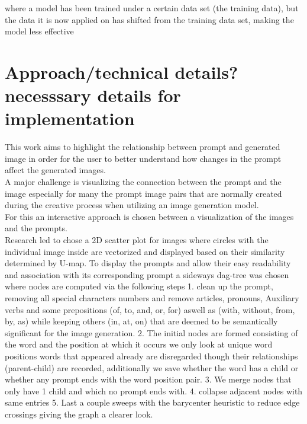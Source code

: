 \documentclass[
  a4paper,  %
  twoside,  %
  bibliography=totoc,
  headsepline,
  cleardoublepage=empty,
  parskip=half,
  draft=false
]{scrbook}
\begin{document}
where a model has been trained under a certain data set (the training data), but the data it is now applied on has shifted from the training data set, making the model less effective 
\chapter{Approach/technical details? necesssary details for implementation}
This work aims to highlight the relationship between prompt and generated image in order for the user to better understand how changes in the prompt affect the generated images. \\
A major challenge is visualizing the connection between the prompt and the image especially for many the prompt image pairs that are normally created during the creative process when utilizing an image generation model.\\
For this an interactive approach is chosen  between a visualization of the images and the prompts.\\ Research led to chose a 2D scatter plot for images where circles with the individual image inside are vectorized and  displayed based on their similarity determined by U-map. To display the prompts and allow their easy readability and association with its corresponding prompt a sideways dag-tree was chosen where nodes are computed via the following steps 1. clean up the prompt, removing all special characters numbers and remove articles, pronouns, Auxiliary verbs and some prepositions (of, to, and, or, for) aswell as (with, without, from, by, as) while keeping others (in, at, on) that are deemed to be semantically significant for the image generation. 2. The initial nodes are formed consisting of the word and the position at which it occurs we only look at unique word positions words that appeared already are disregarded though their relationships (parent-child) are recorded, additionally we save whether the word has a child or whether any prompt ends with the word position pair. 3. We merge nodes that only have 1 child and which no prompt ends with. 4. collapse adjacent nodes with same entries 5. Last a couple sweeps with the barycenter heuristic to reduce edge crossings giving the graph a clearer look.\\
\end{document}
